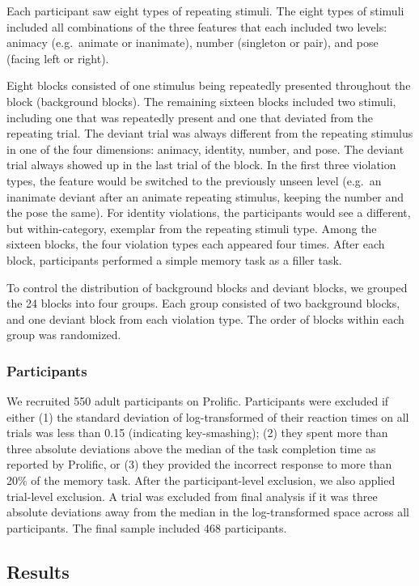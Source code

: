 \documentclass[10pt, letterpaper]{article}
\begin{document}
Each participant saw eight types of repeating stimuli. The eight types
of stimuli included all combinations of the three features that each
included two levels: animacy (e.g.~animate or inanimate), number
(singleton or pair), and pose (facing left or right).

Eight blocks consisted of one stimulus being repeatedly presented
throughout the block (background blocks). The remaining sixteen blocks
included two stimuli, including one that was repeatedly present and one
that deviated from the repeating trial. The deviant trial was always
different from the repeating stimulus in one of the four dimensions:
animacy, identity, number, and pose. The deviant trial always showed up
in the last trial of the block. In the first three violation types, the
feature would be switched to the previously unseen level (e.g.~an
inanimate deviant after an animate repeating stimulus, keeping the
number and the pose the same). For identity violations, the participants
would see a different, but within-category, exemplar from the repeating
stimuli type. Among the sixteen blocks, the four violation types each
appeared four times. After each block, participants performed a simple
memory task as a filler task.

To control the distribution of background blocks and deviant blocks, we
grouped the 24 blocks into four groups. Each group consisted of two
background blocks, and one deviant block from each violation type. The
order of blocks within each group was randomized.

\hypertarget{participants}{%
\subsubsection{Participants}\label{participants}}

We recruited 550 adult participants on Prolific. Participants were
excluded if either (1) the standard deviation of log-transformed of
their reaction times on all trials was less than 0.15 (indicating
key-smashing); (2) they spent more than three absolute deviations above
the median of the task completion time as reported by Prolific, or (3)
they provided the incorrect response to more than 20\% of the memory
task. After the participant-level exclusion, we also applied trial-level
exclusion. A trial was excluded from final analysis if it was three
absolute deviations away from the median in the log-transformed space
across all participants. The final sample included 468 participants.

\hypertarget{results}{%
\subsection{Results}\label{results}}
\end{document}
